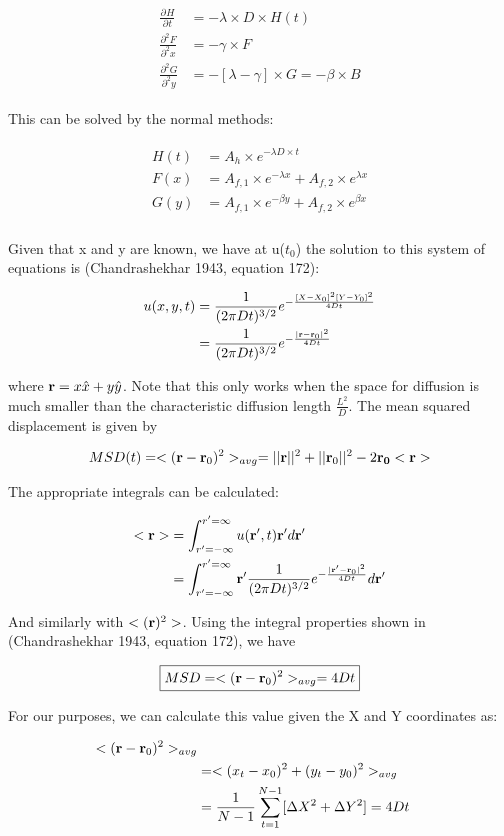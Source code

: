 \documentclass[paper=a4, fontsize=11pt]{scrartcl} %
\numberwithin{equation}{section} %
\numberwithin{figure}{section} %
\numberwithin{table}{section} %
\newcommand{\ndiffn}[3]{\frac{\partial^{#3}#1}{\partial^{#3}#2}}
\newcommand{\diffn}[2]{\ndiffn{#1}{#2}{}}
\newcommand{\vect}[1]{\bold{#1}}
\newcommand{\eqs}[1]{
\begin{align} 
\begin{split}
#1
\end{split}					
\end{align}}
\begin{document}
\eqs{
 \diffn{H}{t} &= -\lambda \times D \times H(t) \\ 
 \ndiffn{F}{x}{2} &= - \gamma \times F  \\
\ndiffn{G}{y}{2} &=  -[\lambda - \gamma] \times G  = - \beta \times B}

This can be solved by the normal methods:

\eqs{
H(t) &= A_h \times e^{-\lambda D \times t} \\
F(x) &= A_{f,1} \times e^{-\lambda x} + A_{f,2} \times e^{\lambda x} \\
G(y) &= A_{f,1} \times e^{-\beta y} + A_{f,2} \times e^{\beta x} \\}

Given that x and y are known, we have at u($t_0$) the solution to this system of equations is (Chandrashekhar 1943, equation 172):

\eqs{
 u(x,y,t) 
&= \frac{1}{(2 \pi D t)^{3/2}} e^{-\frac{[X - X_0]^2[Y-Y_0]^2}{4 D t}  } \\
 &=  \frac{1}{(2 \pi D t)^{3/2}} e^{-\frac{|\vect{r} - \vect{r}_0|^2}{4 D t}  }  }

where $\vect{r} = x\hat{x} + y \hat{y}$. Note that this only works when the space for diffusion is much smaller than the characteristic diffusion length $\frac{L^2}{D}$. The mean squared displacement is given by

\eqs{ MSD(t) 
  &= <(\vect{r} - \vect{r}_0)^2>_{avg} =  ||\vect{r}||^2 + ||\vect{r}_0||^2 - 2 \vect{r_0} <\vect{r}> \\
}

The appropriate integrals can be calculated:

\eqs{  <\vect{r}>
 &= \int_{r'=-\infty}^{r'=\infty} u(\vect{r'},t) \vect{r'} d\vect{r' } \\
&=  \int_{r'=-\infty}^{r'=\infty}
 \vect{r'} \frac{1}{(2 \pi D t)^{3/2}} e^{-\frac{|\vect{r'} - \vect{r}_0|^2}{4 D t}}  d\vect{r'} \\}

And similarly with $<(\vect{r})^2>$. Using the integral properties shown in (Chandrashekhar 1943, equation 172), we have 

\eqs{ \boxed{MSD = <(\vect{r} - \vect{r}_0)^2>_{avg} = 4 D t }}

For our purposes, we can calculate this value given the X and Y coordinates as:

\eqs{  <(\vect{r} - \vect{r}_0)^2>_{avg}\\
 &=  <(x_t - x_0)^2 + (y_t-y_0)^2>_{avg}  \\
&= \frac{1}{N-1} \sum_{t=1}^{N-1} [\Delta X^2 + \Delta Y^2] = 4Dt }








\end{document}
